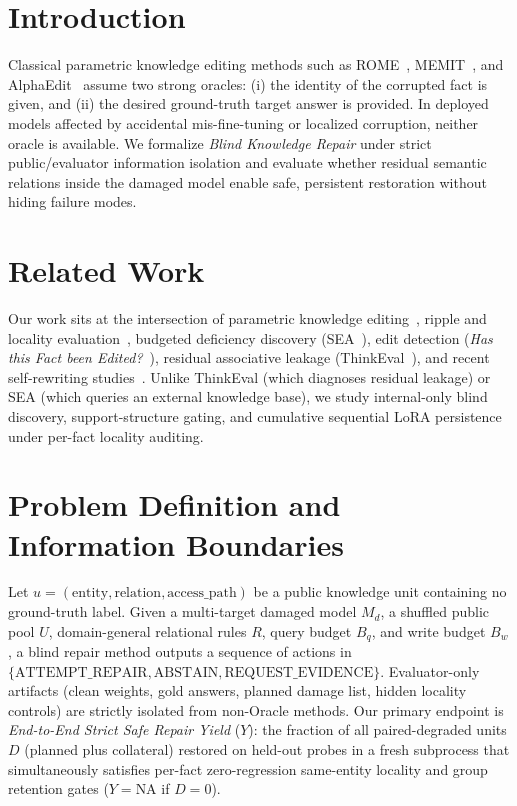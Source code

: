 \documentclass[11pt]{article}
\begin{document}
\section{Introduction}
Classical parametric knowledge editing methods such as ROME~\cite{meng2022rome}, MEMIT~\cite{meng2023memit}, and AlphaEdit~\cite{fang2025alphaedit} assume two strong oracles: (i) the identity of the corrupted fact is given, and (ii) the desired ground-truth target answer is provided. In deployed models affected by accidental mis-fine-tuning or localized corruption, neither oracle is available. We formalize \emph{Blind Knowledge Repair} under strict public/evaluator information isolation and evaluate whether residual semantic relations inside the damaged model enable safe, persistent restoration without hiding failure modes.

\section{Related Work}
Our work sits at the intersection of parametric knowledge editing~\cite{meng2022rome,meng2023memit,fang2025alphaedit}, ripple and locality evaluation~\cite{cohen2024rippleedits}, budgeted deficiency discovery (SEA~\cite{sea2025colm}), edit detection (\emph{Has this Fact been Edited?}~\cite{editdetect2025naacl}), residual associative leakage (ThinkEval~\cite{thinkeval2026tmlr}), and recent self-rewriting studies~\cite{selfrewrite2026arxiv}. Unlike ThinkEval (which diagnoses residual leakage) or SEA (which queries an external knowledge base), we study internal-only blind discovery, support-structure gating, and cumulative sequential LoRA persistence under per-fact locality auditing.

\section{Problem Definition and Information Boundaries}
Let $u = (\text{entity}, \text{relation}, \text{access\_path})$ be a public knowledge unit containing no ground-truth label. Given a multi-target damaged model $M_d$, a shuffled public pool $U$, domain-general relational rules $R$, query budget $B_q$, and write budget $B_w$, a blind repair method outputs a sequence of actions in $\{\text{ATTEMPT\_REPAIR}, \text{ABSTAIN}, \text{REQUEST\_EVIDENCE}\}$. Evaluator-only artifacts (clean weights, gold answers, planned damage list, hidden locality controls) are strictly isolated from non-Oracle methods. Our primary endpoint is \emph{End-to-End Strict Safe Repair Yield} ($Y$): the fraction of all paired-degraded units $D$ (planned plus collateral) restored on held-out probes in a fresh subprocess that simultaneously satisfies per-fact zero-regression same-entity locality and group retention gates ($Y=\text{NA}$ if $D=0$).
\end{document}
